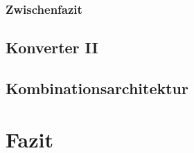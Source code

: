 \documentclass[
  DIV=calc,
  BCOR=5mm,
  11pt,
  headings=small,
  oneside,
  abstract=true,
  toc=bib,
  english,ngerman]{scrartcl}
\begin{document}
 

 

 
 
 

 

 
\subsubsection{Zwischenfazit}

\subsection{Konverter II}

\subsection{Kombinationsarchitektur}

\section{Fazit}




%
\printnomenclature


\end{document}
